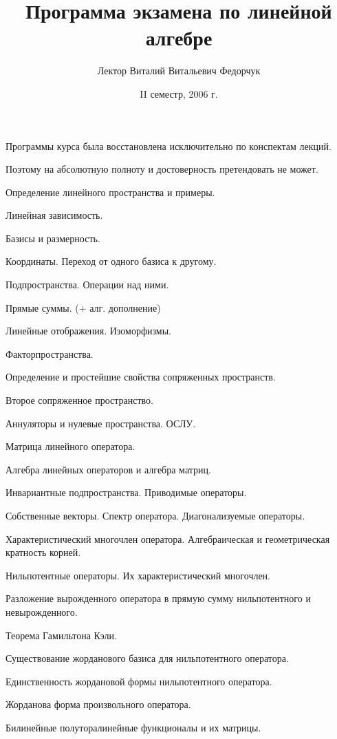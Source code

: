 \documentclass[a4paper]{article}
\title{Программа экзамена по линейной алгебре}
\author{Лектор Виталий Витальевич Федорчук}
\date{II семестр, 2006 г.}
\begin{document}
\maketitle

\centerline{\scriptsize Программы курса была восстановлена исключительно по конспектам лекций.}
\centerline{\scriptsize Поэтому на абсолютную полноту и достоверность претендовать не может.}

\begin{nums}{-1}
\item Определение линейного пространства и примеры.
\item Линейная зависимость.
\item Базисы и размерность.
\item Координаты. Переход от одного базиса к другому.
\item Подпространства. Операции над ними.
\item Прямые суммы. (+ алг. дополнение)
\item Линейные отображения. Изоморфизмы.
\item Факторпространства.
\item Определение и простейшие свойства сопряженных пространств.
\item Второе сопряженное пространство.
\item Аннуляторы и нулевые пространства. ОСЛУ.
\item Матрица линейного оператора.
\item Алгебра линейных операторов и алгебра матриц.
\item Инвариантные подпространства. Приводимые операторы.
\item Собственные векторы. Спектр оператора. Диагонализуемые операторы.
\item Характеристический многочлен оператора. Алгебраическая и геометрическая кратность корней.
\item Нильпотентные операторы. Их характеристический многочлен.
\item Разложение вырожденного оператора в прямую сумму нильпотентного и невырожденного.
\item Теорема Гамильтона Кэли.
\item Существование жорданового базиса для нильпотентного оператора.
\item Единственность жордановой формы нильпотентного оператора.
\item Жорданова форма произвольного оператора.
\item Билинейные  полуторалинейные функционалы и их матрицы.

\end{nums}
\end{document}
